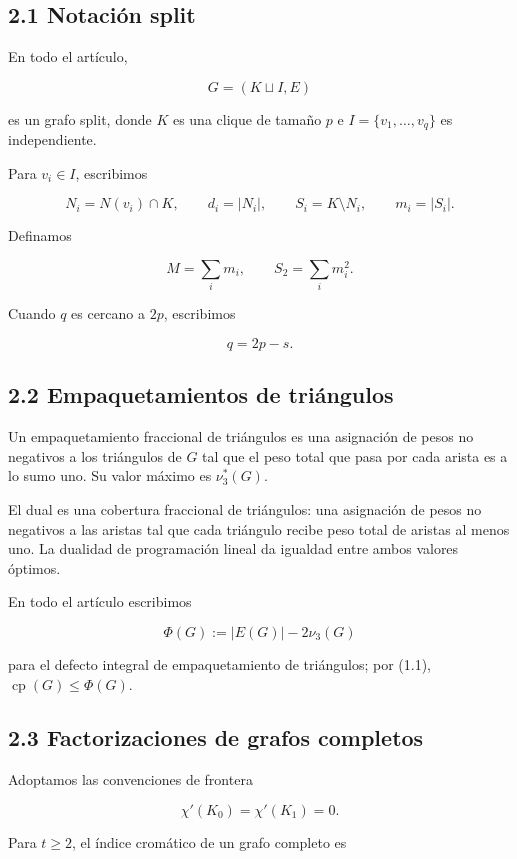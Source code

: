 \documentclass[
  spanish,
  11pt,
  a4paper,
]{article}
\begin{document}
\subsection{2.1 Notación split}\label{notaciuxf3n-split}

En todo el artículo,

\[
G=(K\sqcup I,E)
\]

es un grafo split, donde \(K\) es una clique de tamaño \(p\) e \(I=\{v_1,\ldots,v_q\}\) es independiente.

Para \(v_i\in I\), escribimos

\[
N_i=N(v_i)\cap K,
\qquad
d_i=|N_i|,
\qquad
S_i=K\setminus N_i,
\qquad
m_i=|S_i|.
\]

Definamos

\[
M=\sum_i m_i,
\qquad
S_2=\sum_i m_i^2.
\]

Cuando \(q\) es cercano a \(2p\), escribimos

\[
q=2p-s.
\tag{2.1}
\]

\subsection{2.2 Empaquetamientos de triángulos}\label{empaquetamientos-de-triuxe1ngulos}

Un empaquetamiento fraccional de triángulos es una asignación de pesos no negativos a los triángulos de \(G\) tal que el peso total que pasa por cada arista es a lo sumo uno. Su valor máximo es \(\nu_3^*(G)\).

El dual es una cobertura fraccional de triángulos: una asignación de pesos no negativos a las aristas tal que cada triángulo recibe peso total de aristas al menos uno. La dualidad de programación lineal da igualdad entre ambos valores óptimos.

En todo el artículo escribimos

\[
\Phi(G):=|E(G)|-2\nu_3(G)
\]

para el defecto integral de empaquetamiento de triángulos; por (1.1), \(\operatorname{cp}(G)\le\Phi(G)\).

\subsection{2.3 Factorizaciones de grafos completos}\label{factorizaciones-de-grafos-completos}

Adoptamos las convenciones de frontera

\[
\chi'(K_0)=\chi'(K_1)=0.
\]

Para \(t\ge2\), el índice cromático de un grafo completo es
\end{document}
